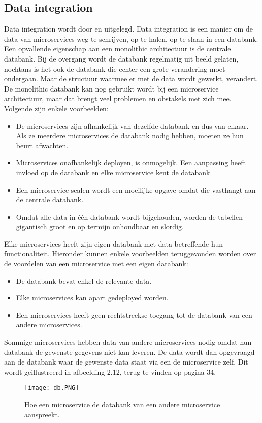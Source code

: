 \subsection{Data integration}
Data integration wordt door \textcite{Aradhye2018} en \textcite{Kumar2018} uitgelegd. Data integration is een manier om de data van microservices weg te schrijven, op te halen, op te slaan in een databank.
Een opvallende eigenschap aan een monolithic architectuur is de centrale databank. Bij de overgang wordt de databank regelmatig uit beeld gelaten, nochtans is het ook de databank die echter een grote verandering moet ondergaan. Maar de structuur waarmee er met de data wordt gewerkt, verandert. 
De monolithic databank kan nog gebruikt wordt bij een microservice architectuur, maar  dat brengt veel problemen en obstakels met zich mee. Volgende zijn enkele voorbeelden:
\begin{itemize}
	\item De microservices zijn afhankelijk van dezelfde databank en dus van elkaar. Als ze meerdere microservices de databank nodig hebben, moeten ze hun beurt afwachten.
	\item Microservices onafhankelijk deployen, is onmogelijk. Een aanpassing heeft invloed op de databank en elke microservice kent de databank. 
	\item Een microservice scalen wordt een moeilijke opgave omdat die vasthangt aan de centrale databank. 
	\item Omdat alle data in één databank wordt bijgehouden, worden de tabellen gigantisch groot en op termijn onhoudbaar en slordig. 
\end{itemize}

Elke microservices heeft zijn eigen databank met data betreffende hun functionaliteit. Hieronder kunnen enkele voorbeelden teruggevonden worden over de voordelen van een microservice met een eigen databank:
\begin{itemize}
	\item De databank bevat enkel de relevante data.
	\item Elke microservices kan apart gedeployed worden. 
	\item Een microservices heeft geen rechtstreekse toegang tot de databank van een andere microservices. 
\end{itemize}

Sommige microservices hebben data van andere microservices nodig omdat hun databank de gewenste gegevens niet kan leveren. De data wordt dan opgevraagd aan de databank waar de gewenste data staat via een de microservice zelf. Dit wordt geillustreerd in afbeelding 2.12, terug te vinden op pagina 34.
\begin{figure}[h!]
	\texttt{[image: db.PNG]}
	\centering
	\caption{Hoe een microservice de databank van een andere microservice aanspreekt.}
\end{figure}
 
